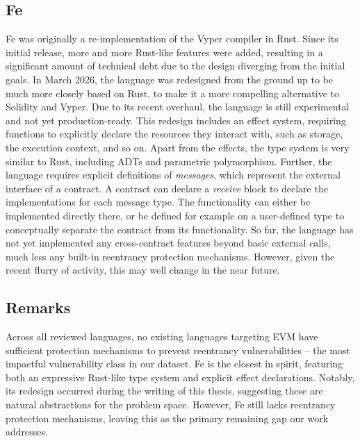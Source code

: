 \subsection{Fe}

Fe \cite{fe} was originally a re-implementation of the Vyper compiler in Rust. Since its initial release, more and more Rust-like features were added, resulting in a significant amount of technical debt due to the design diverging from the initial goals. In March 2026, the language was redesigned from the ground up \cite{fe26} to be much more closely based on Rust, to make it a more compelling alternative to Solidity and Vyper. Due to its recent overhaul, the language is still experimental and not yet production-ready. This redesign includes an effect system, requiring functions to explicitly declare the resources they interact with, such as storage, the execution context, and so on. Apart from the effects, the type system is very similar to Rust, including ADTs and parametric polymorphism. Further, the language requires explicit definitions of \textit{messages}, which represent the external interface of a contract. A contract can declare a \textit{receive} block to declare the implementations for each message type. The functionality can either be implemented directly there, or be defined for example on a user-defined type to conceptually separate the contract from its functionality. So far, the language has not yet implemented any cross-contract features beyond basic external calls, much less any built-in reentrancy protection mechanisms. However, given the recent flurry of activity, this may well change in the near future.

\subsection{Remarks}

Across all reviewed languages, no existing languages targeting EVM have sufficient protection mechanisms to prevent reentrancy vulnerabilities -- the most impactful vulnerability class in our dataset. Fe is the closest in spirit, featuring both an expressive Rust-like type system and explicit effect declarations. Notably, its redesign occurred during the writing of this thesis, suggesting these are natural abstractions for the problem space. However, Fe still lacks reentrancy protection mechanisms, leaving this as the primary remaining gap our work addresses.


